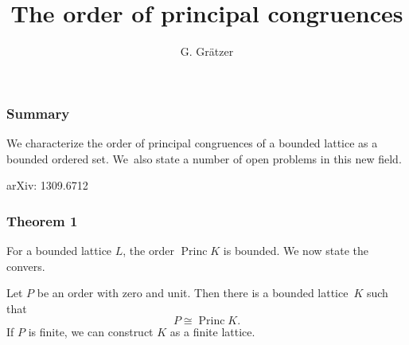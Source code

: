\documentclass[leqno]{beamer}
\DeclareMathOperator{\Princ}{Princ}
\begin{document}
\title[The order of principal congruences of a bounded lattice]{
    The order of principal congruences
}
\author{G. Gr\"atzer}

\maketitle

\begin{frame}
    \frametitle{Summary}
    We characterize the order of principal congruences
    of a bounded lattice as a bounded ordered set.
    We~also state a number of open problems in this new field.

    \medskip

    arXiv: 1309.6712
\end{frame}

\begin{frame}
    \frametitle{Theorem 1}
    For a bounded lattice $L$, the order $\Princ K$ is bounded.
    We now state the convers.
    \pause

    \begin{theorem}
        Let $P$ be an order with zero and unit.
        Then there is a bounded lattice~$K$ such that
        \[
            P \cong \Princ K.
        \]
        If $P$ is finite, we can construct $K$ as a finite lattice.
    \end{theorem}
\end{frame}
\end{document}

